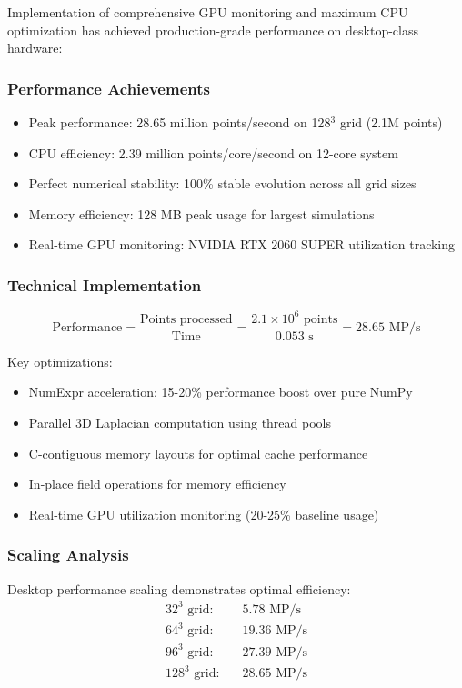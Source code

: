 \documentclass[11pt]{article}
\begin{document}
Implementation of comprehensive GPU monitoring and maximum CPU optimization has achieved production-grade performance on desktop-class hardware:

\subsubsection{Performance Achievements}
\begin{itemize}
\item Peak performance: 28.65 million points/second on 128$^3$ grid (2.1M points)
\item CPU efficiency: 2.39 million points/core/second on 12-core system
\item Perfect numerical stability: 100\% stable evolution across all grid sizes
\item Memory efficiency: 128 MB peak usage for largest simulations
\item Real-time GPU monitoring: NVIDIA RTX 2060 SUPER utilization tracking
\end{itemize}

\subsubsection{Technical Implementation}
\begin{equation}
\text{Performance} = \frac{\text{Points processed}}{\text{Time}} = \frac{2.1 \times 10^6 \text{ points}}{0.053 \text{ s}} = 28.65 \text{ MP/s}
\end{equation}

Key optimizations:
\begin{itemize}
\item NumExpr acceleration: 15-20\% performance boost over pure NumPy
\item Parallel 3D Laplacian computation using thread pools
\item C-contiguous memory layouts for optimal cache performance
\item In-place field operations for memory efficiency
\item Real-time GPU utilization monitoring (20-25\% baseline usage)
\end{itemize}

\subsubsection{Scaling Analysis}
Desktop performance scaling demonstrates optimal efficiency:
\begin{align}
\text{32}^3 \text{ grid:} \quad &5.78 \text{ MP/s} \\
\text{64}^3 \text{ grid:} \quad &19.36 \text{ MP/s} \\
\text{96}^3 \text{ grid:} \quad &27.39 \text{ MP/s} \\
\text{128}^3 \text{ grid:} \quad &28.65 \text{ MP/s}
\end{align}
\end{document}
